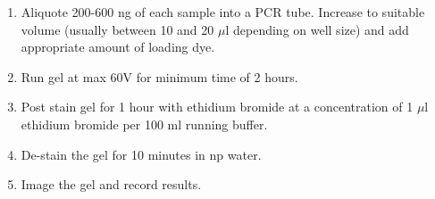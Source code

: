 \documentclass[12pt]{article}
\theoremstyle{definition}
\begin{document}
\begin{enumerate}
\item Aliquote 200-600 ng of each sample into a PCR tube. Increase to suitable volume (usually between 10 and 20 $\mu$l depending on well size) and add appropriate amount of loading dye. 

\item Run gel at max 60V for minimum time of 2 hours.

\item Post stain gel for 1 hour with ethidium bromide at a concentration of 1 $\mu$l ethidium bromide per 100 ml running buffer. 

\item De-stain the gel for 10 minutes in np water.

\item Image the gel and record results.




\end{enumerate}
\end{document}
